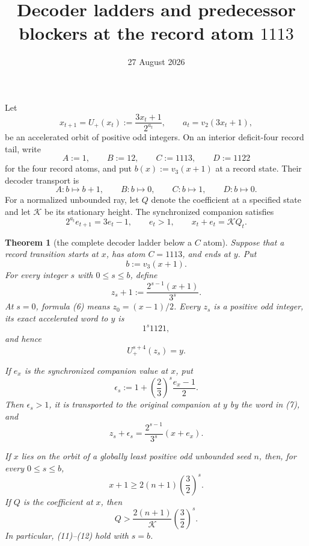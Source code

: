 \documentclass[11pt]{article}
\title{Decoder ladders and predecessor blockers at the record atom $1113$}
\author{}
\date{27 August 2026}
\newtheorem{theorem}{Theorem}
\newcommand{\Up}{U_+}
\begin{document}
\maketitle

Let
\[
 x_{t+1}=\Up(x_t):=\frac{3x_t+1}{2^{a_t}},
 \qquad a_t=v_2(3x_t+1),
 \tag{1}
\]
be an accelerated orbit of positive odd integers.  On an interior
deficit-four record tail, write
\[
 A:=1,\qquad B:=12,\qquad C:=1113,\qquad D:=1122
 \tag{2}
\]
for the four record atoms, and put $b(x):=v_3(x+1)$ at a record state.
Their decoder transport is
\[
 A:b\mapsto b+1,
 \qquad B:b\mapsto0,
 \qquad C:b\mapsto1,
 \qquad D:b\mapsto0.
 \tag{3}
\]
For a normalized unbounded ray, let $Q$ denote the coefficient at a
specified state and let $\mathcal K$ be its stationary height.  The
synchronized companion satisfies
\[
 2^{a_t}e_{t+1}=3e_t-1,
 \qquad e_t>1,
 \qquad x_t+e_t=\mathcal KQ_t.
 \tag{4}
\]

\begin{theorem}[the complete decoder ladder below a $C$ atom]
Suppose that a record transition starts at $x$, has atom $C=1113$, and
ends at $y$.  Put
\[
 b:=v_3(x+1).
 \tag{5}
\]
For every integer $s$ with $0\leq s\leq b$, define
\[
 \boxed{
 z_s+1:=\frac{2^{s-1}(x+1)}{3^s}.}
 \tag{6}
\]
At $s=0$, formula (6) means $z_0=(x-1)/2$.  Every $z_s$ is a positive
odd integer, its exact accelerated word to $y$ is
\[
 \boxed{1^s1121,}
 \tag{7}
\]
and hence
\[
 \Up^{s+4}(z_s)=y.
 \tag{8}
\]

If $e_x$ is the synchronized companion value at $x$, put
\[
 \epsilon_s
 :=1+\left(\frac23\right)^s\frac{e_x-1}{2}.
 \tag{9}
\]
Then $\epsilon_s>1$, it is transported to the original companion at $y$
by the word in (7), and
\[
 \boxed{
 z_s+\epsilon_s
 =\frac{2^{s-1}}{3^s}(x+e_x).}
 \tag{10}
\]

If $x$ lies on the orbit of a globally least positive odd unbounded seed
$n$, then, for every $0\leq s\leq b$,
\[
 \boxed{
 x+1\geq2(n+1)\left(\frac32\right)^s.}
 \tag{11}
\]
If $Q$ is the coefficient at $x$, then
\[
 \boxed{
 Q>\frac{2(n+1)}{\mathcal K}
       \left(\frac32\right)^s.}
 \tag{12}
\]
In particular, (11)--(12) hold with $s=b$.
\end{theorem}
\end{document}
